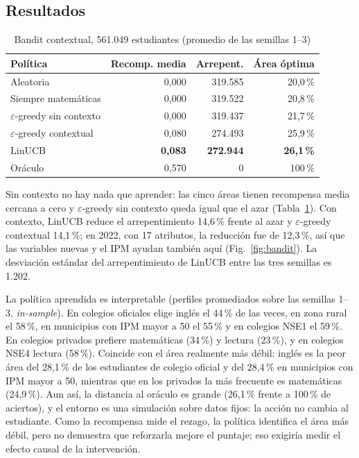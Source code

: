 \documentclass[conference]{IEEEtran}
\begin{document}
\subsection{Resultados}
\begin{table}[t]
\caption{Bandit contextual, 561.049 estudiantes (promedio de las semillas 1--3)}
\label{tab:bandit}
\centering\small\setlength{\tabcolsep}{4pt}
\begin{tabular}{lrrr}
\toprule
Política & Recomp. media & Arrepent. & Área óptima \\
\midrule
Aleatoria & 0,000 & 319.585 & 20,0\,\% \\
Siempre matemáticas & 0,000 & 319.522 & 20,8\,\% \\
$\varepsilon$-greedy sin contexto & 0,000 & 319.437 & 21,7\,\% \\
$\varepsilon$-greedy contextual & 0,080 & 274.493 & 25,9\,\% \\
LinUCB & \textbf{0,083} & \textbf{272.944} & \textbf{26,1\,\%} \\
Oráculo & 0,570 & 0 & 100\,\% \\
\bottomrule
\end{tabular}
\end{table}

Sin contexto no hay nada que aprender: las cinco áreas tienen recompensa media cercana a cero y $\varepsilon$-greedy sin contexto queda igual que el azar (Tabla~\ref{tab:bandit}). Con contexto, LinUCB reduce el arrepentimiento 14,6\,\% frente al azar y $\varepsilon$-greedy contextual 14,1\,\%; en 2022, con 17 atributos, la reducción fue de 12,3\,\%, así que las variables nuevas y el IPM ayudan también aquí (Fig.~\ref{fig:bandit}). La desviación estándar del arrepentimiento de LinUCB entre las tres semillas es 1.202.

La política aprendida es interpretable (perfiles promediados sobre las semillas 1--3, \emph{in-sample}). En colegios oficiales elige inglés el 44\,\% de las veces, en zona rural el 58\,\%, en municipios con IPM mayor a 50 el 55\,\% y en colegios NSE1 el 59\,\%. En colegios privados prefiere matemáticas (34\,\%) y lectura (23\,\%), y en colegios NSE4 lectura (58\,\%). Coincide con el área realmente más débil: inglés es la peor área del 28,1\,\% de los estudiantes de colegio oficial y del 28,4\,\% en municipios con IPM mayor a 50, mientras que en los privados la más frecuente es matemáticas (24,9\,\%). Aun así, la distancia al oráculo es grande (26,1\,\% frente a 100\,\% de aciertos), y el entorno es una simulación sobre datos fijos: la acción no cambia al estudiante. Como la recompensa mide el rezago, la política identifica el área más débil, pero no demuestra que reforzarla mejore el puntaje; eso exigiría medir el efecto causal de la intervención.
\end{document}
